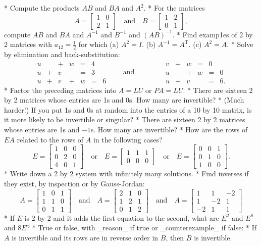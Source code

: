 * Compute the products \(AB\) and \(BA\) and \(A^{2}\).
* For the matrices \[A=\begin{bmatrix}1&0\\ 2&1\end{bmatrix}\quad\text{and}\quad B=\begin{bmatrix}1&2\\ 0&1\end{bmatrix},\] compute \(AB\) and \(BA\) and \(A^{-1}\) and \(B^{-1}\) and \((AB)^{-1}\).
* Find examp1es of 2 by 2 matrices with \(a_{12}=\frac{1}{2}\) for which (a) \(A^{2}=I\). (b) \(A^{-1}=A^{\text{T}}\). (c) \(A^{2}=A\).
* Solve by elimination and back-substitution: \[\begin{array}{ccccccccc}u&&+&w&=&4\\ u&+&v&&=&3\\ u&+&v&+&w&=&6\end{array}\qquad\text{and}\qquad\qquad\begin{array}{ccccc}v&+&w&=& 0\\ u&&+&w&=&0\\ u&+&v&&=&6.\end{array}\]
* Factor the preceding matrices into \(A=LU\) or \(PA=LU\).
* There are sixteen 2 by 2 matrices whose entries are 1s and 0s. How many are invertible?
* (Much harder!) If you put 1s and 0s at random into the entries of a 10 by 10 matrix, is it more likely to be invertible or singular?
* There are sixteen 2 by 2 matrices whose entries are 1s and \(-1\)s. How many are invertible?
* How are the rows of \(EA\) related to the rows of \(A\) in the following cases? \[E=\begin{bmatrix}1&0&0\\ 0&2&0\\ 4&0&1\end{bmatrix}\quad\text{or}\quad E=\begin{bmatrix}1&1&1\\ 0&0&0\end{bmatrix}\quad\text{or}\quad E=\begin{bmatrix}0&0&1\\ 0&1&0\\ 1&0&0\end{bmatrix}.\]
* Write down a 2 by 2 system with infinitely many solutions.
* Find inverses if they exist, by inspection or by Gauss-Jordan: \[A=\begin{bmatrix}1&0&1\\ 1&1&0\\ 0&1&1\end{bmatrix}\quad\text{and}\quad A=\begin{bmatrix}2&1&0\\ 1&2&1\\ 0&1&2\end{bmatrix}\quad\text{and}\quad A=\begin{bmatrix}1&1&-2\\ 1&-2&1\\ -2&1&1\end{bmatrix}\]
* If \(E\) is 2 by 2 and it adds the first equation to the second, what are \(E^{2}\) and \(E^{8}\) and \(8E\)?
* True or false, with _reason_ if true or _counterexample_ if false:
* If \(A\) is invertible and its rows are in reverse order in \(B\), then \(B\) is invertible.
 